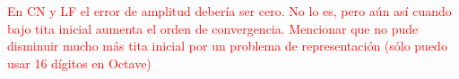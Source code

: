 \documentclass[aps,prb,twocolumn,superscriptaddress,floatfix,longbibliography]{revtex4-2}
\newcounter{para}
\begin{document}
\textcolor{red}{En CN y LF el error de amplitud debería ser cero. No lo es, pero aún así cuando bajo tita inicial aumenta el orden de convergencia. Mencionar que no pude disminuir mucho más tita inicial por un problema de representación (sólo puedo usar 16 dígitos en Octave)}







\end{document}
